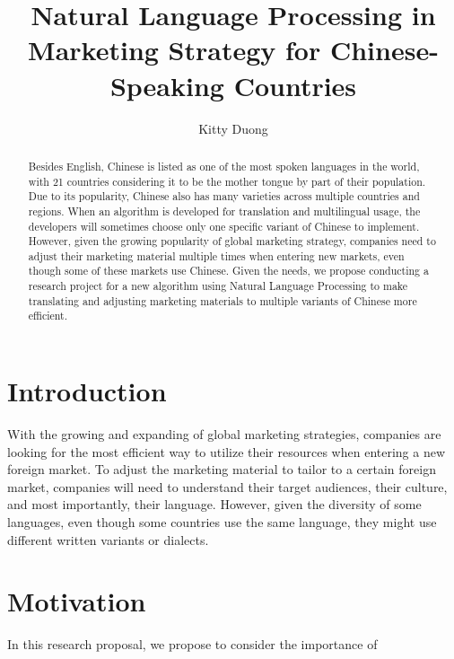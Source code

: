 \documentclass[sigconf]{acmart}
\begin{document}
\title{Natural Language Processing in Marketing Strategy for Chinese-Speaking Countries}
\author{Kitty Duong}

\begin{abstract}
Besides English, Chinese is listed as one of the most spoken languages in the world, with 21 countries considering it to be the mother tongue by part of their population. Due to its popularity, Chinese also has many varieties across multiple countries and regions. When an algorithm is developed for translation and multilingual usage, the developers will sometimes choose only one specific variant of Chinese to implement. However, given the growing popularity of global marketing strategy, companies need to adjust their marketing material multiple times when entering new markets, even though some of these markets use Chinese. Given the needs, we propose conducting a research project for a new algorithm using Natural Language Processing to make translating and adjusting marketing materials to multiple variants of Chinese more efficient.
\end{abstract}


\maketitle

\section{Introduction}
With the growing and expanding of global marketing strategies, companies are looking for the most efficient way to utilize their resources when entering a new foreign market. To adjust the marketing material to tailor to a certain foreign market, companies will need to understand their target audiences, their culture, and most importantly, their language. However, given the diversity of some languages, even though some countries use the same language, they might use different written variants or dialects. 

\section{Motivation}
In this research proposal, we propose to consider the importance of 
\end{document}
